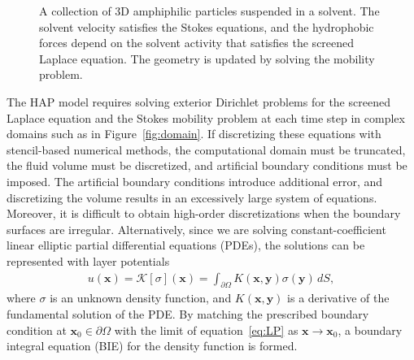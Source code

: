 \label{subsec:specific_aim_2}
\begin{figure}
    \vspace{-15pt}
    \caption{\label{fig:flow_map} \footnotesize A collection of 3D
    amphiphilic particles suspended in a solvent. The solvent velocity
    satisfies the Stokes equations, and the hydrophobic forces depend on
    the solvent activity that satisfies the screened Laplace equation.
    The geometry is updated by solving the mobility problem.} 
\end{figure}
The HAP model requires solving exterior Dirichlet problems for the
screened Laplace equation and the Stokes mobility problem at each time
step in complex domains such as in Figure~\ref{fig:domain}. If
discretizing these equations with stencil-based numerical methods, the
computational domain must be truncated, the fluid volume must be
discretized, and artificial boundary conditions must be imposed. The
artificial boundary conditions introduce additional error, and
discretizing the volume results in an excessively large system of
equations. Moreover, it is difficult to obtain high-order
discretizations when the boundary surfaces are irregular. Alternatively,
since we are solving constant-coefficient linear elliptic partial
differential equations (PDEs), the solutions can be represented with
layer potentials
\begin{align}
  \label{eq:LP}
  u(\mathbf{x}) = \mathcal{K}[\sigma](\mathbf{x}) = 
  \int_{\partial\Omega} K(\mathbf{x},\mathbf{y})
  \sigma(\mathbf{y})\,dS,
\end{align}
where $\sigma$ is an unknown density function, and
$K(\mathbf{x},\mathbf{y})$ is a derivative of the fundamental solution
of the PDE. By matching the prescribed boundary condition at
$\mathbf{x}_0 \in \partial\Omega$ with the limit of
equation~\eqref{eq:LP} as $\mathbf{x}\rightarrow \mathbf{x}_0$, a
boundary integral equation (BIE) for the density function is formed. 

